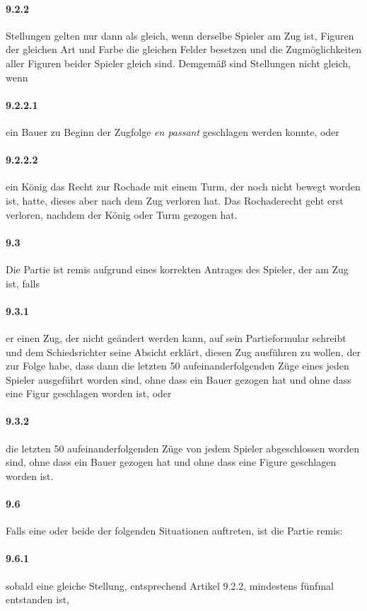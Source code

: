 \documentclass[
  a4paper,
  justified,
  nobib,
]{tufte-handout}
\begin{document}
\paragraph{9.2.2} Stellungen gelten nur dann als gleich, wenn derselbe Spieler am Zug ist,
Figuren der gleichen Art und Farbe die gleichen Felder besetzen und die Zugmöglichkeiten
aller Figuren beider Spieler gleich sind. Demgemäß sind Stellungen nicht gleich, wenn
\paragraph{9.2.2.1} ein Bauer zu Beginn der Zugfolge \emph{en passant} geschlagen werden
konnte, oder
\paragraph{9.2.2.2} ein König das Recht zur Rochade mit einem Turm, der noch nicht bewegt
worden ist, hatte, dieses aber nach dem Zug verloren hat. Das Rochaderecht geht erst
verloren, nachdem der König oder Turm gezogen hat.
\paragraph{9.3} Die Partie ist remis aufgrund eines korrekten Antrages des Spieler, der am
Zug ist, falls
\paragraph{9.3.1} er einen Zug, der nicht geändert werden kann, auf sein Partieformular
schreibt und dem Schiedsrichter seine Absicht erklärt, diesen Zug ausführen zu wollen, der
zur Folge habe, dass dann die letzten 50 aufeinanderfolgenden Züge eines jeden Spieler
ausgeführt worden sind, ohne dass ein Bauer gezogen hat und ohne dass eine Figur
geschlagen worden ist, oder
\paragraph{9.3.2} die letzten 50 aufeinanderfolgenden Züge von jedem Spieler abgeschlossen
worden sind, ohne dass ein Bauer gezogen hat und ohne dass eine Figure geschlagen worden
ist.
\paragraph{9.6} Falls eine oder beide der folgenden Situationen auftreten, ist die Partie
remis:
\paragraph{9.6.1} sobald eine gleiche Stellung, entsprechend Artikel 9.2.2, mindestens
fünfmal entstanden ist,
\end{document}
